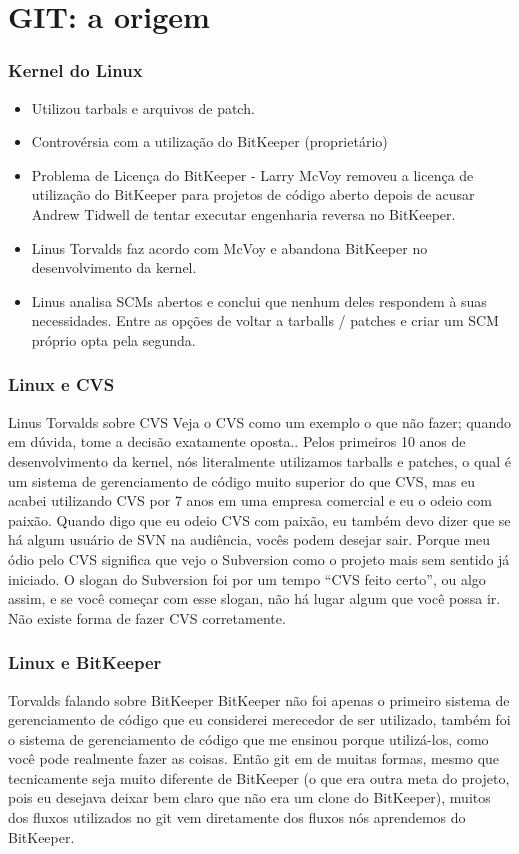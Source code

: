 \section{GIT: a origem}

\begin{frame}
\frametitle{Kernel do Linux}

\begin{itemize}
\item Utilizou tarbals e arquivos de patch.
\item Controvérsia com a utilização do BitKeeper (proprietário)
\item Problema de Licença do BitKeeper - Larry McVoy removeu a licença de utilização do BitKeeper para projetos de código aberto depois de acusar Andrew Tidwell de tentar executar engenharia reversa no BitKeeper.
\item Linus Torvalds faz acordo com McVoy e abandona BitKeeper no desenvolvimento da kernel.
\item Linus analisa SCMs abertos e conclui que nenhum deles respondem à suas necessidades. Entre as opções de voltar a tarballs / patches e criar um SCM próprio opta pela segunda.
\end{itemize}
\end{frame}

\begin{frame}
\frametitle{Linux e CVS}

\begin{block}{Linus Torvalds sobre CVS}
Veja o CVS como um exemplo o que não fazer; quando em dúvida, tome a decisão exatamente oposta..
Pelos primeiros 10 anos de desenvolvimento da kernel, nós literalmente utilizamos tarballs e patches, o qual é um sistema de gerenciamento de código muito superior do que CVS, mas eu acabei utilizando CVS por 7 anos em uma
empresa comercial e eu o odeio com paixão. Quando digo que eu odeio CVS com paixão, eu também devo dizer que se há algum usuário de SVN na audiência, vocês podem desejar sair. Porque meu ódio pelo CVS significa que
vejo o Subversion como o projeto mais sem sentido já iniciado. O slogan do Subversion foi por um tempo “CVS feito certo”, ou algo assim, e se você começar com esse slogan, não há lugar algum que você possa ir. Não existe forma de fazer CVS corretamente.
\end{block}
\end{frame}

\begin{frame}
\frametitle{Linux e BitKeeper}
\begin{block}{Torvalds falando sobre BitKeeper}
BitKeeper não foi apenas o primeiro sistema de gerenciamento de código que eu considerei merecedor de ser utilizado, também foi o sistema de gerenciamento de código que me ensinou porque utilizá-los, como você pode realmente fazer as coisas. Então git em de muitas formas, mesmo que tecnicamente seja muito diferente de BitKeeper (o que era outra meta do projeto, pois eu desejava deixar bem claro que não era um clone do BitKeeper), muitos dos fluxos utilizados no git vem diretamente dos fluxos nós aprendemos do BitKeeper.
\end{block}
\end{frame}

